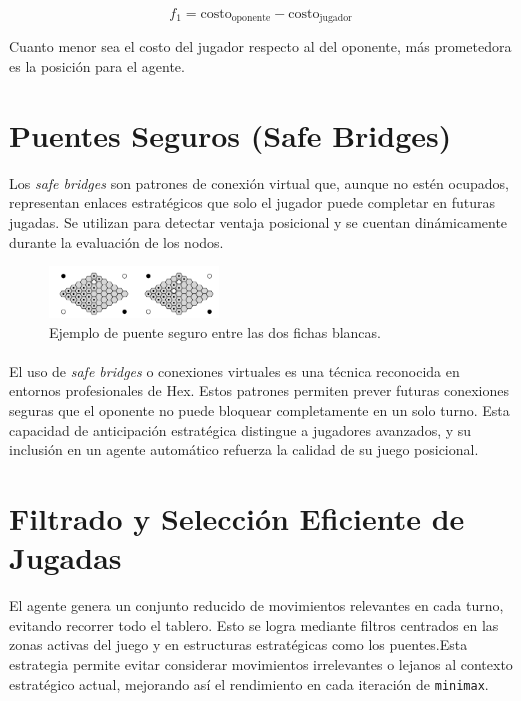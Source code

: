 \documentclass[12pt]{article}
\begin{document}
\[
f_1 = \text{costo}_{\text{oponente}} - \text{costo}_{\text{jugador}}
\]

Cuanto menor sea el costo del jugador respecto al del oponente, más prometedora es la posición para el agente.

\section{Puentes Seguros (Safe Bridges)}
Los \textit{safe bridges} son patrones de conexión virtual que, aunque no estén ocupados, representan enlaces estratégicos que solo el jugador puede completar en futuras jugadas. Se utilizan para detectar ventaja posicional y se cuentan dinámicamente durante la evaluación de los nodos.

\begin{figure}[H]
    \centering
    \includegraphics[width=0.4\textwidth]{img/safe-bridge.png}
    \caption{Ejemplo de puente seguro entre las dos fichas blancas.}
    \label{fig:safe_bridge}
\end{figure}

\paragraph{}
El uso de \textit{safe bridges} o conexiones virtuales es una técnica reconocida en entornos profesionales de Hex. Estos patrones permiten prever futuras conexiones seguras que el oponente no puede bloquear completamente en un solo turno. Esta capacidad de anticipación estratégica distingue a jugadores avanzados, y su inclusión en un agente automático refuerza la calidad de su juego posicional.


\section{Filtrado y Selección Eficiente de Jugadas}

El agente genera un conjunto reducido de movimientos relevantes en cada turno, evitando recorrer todo el tablero. Esto se logra mediante filtros centrados en las zonas activas del juego y en estructuras estratégicas como los puentes.Esta estrategia permite evitar considerar movimientos irrelevantes o lejanos al contexto estratégico actual, mejorando así el rendimiento en cada iteración de \texttt{minimax}.
\end{document}
